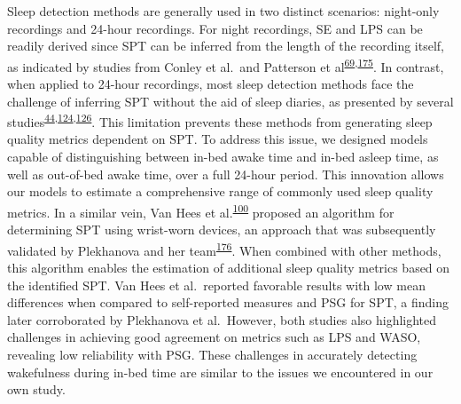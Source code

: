 \documentclass[
  10pt,
]{scrbook}
\begin{document}
Sleep detection methods are generally used in two distinct scenarios:
night-only recordings and 24-hour recordings. For night recordings, SE
and LPS can be readily derived since SPT can be inferred from the length
of the recording itself, as indicated by studies from Conley et al.~and
Patterson et
al\textsuperscript{\protect\hyperlink{ref-conley_agreement_2019}{69},\protect\hyperlink{ref-patterson_40_2023}{175}}.
In contrast, when applied to 24-hour recordings, most sleep detection
methods face the challenge of inferring SPT without the aid of sleep
diaries, as presented by several
studies\textsuperscript{\protect\hyperlink{ref-girschik_validation_2012}{44},\protect\hyperlink{ref-doherty_large_2017}{124},\protect\hyperlink{ref-anderson_assessment_2014}{126}}.
This limitation prevents these methods from generating sleep quality
metrics dependent on SPT. To address this issue, we designed models
capable of distinguishing between in-bed awake time and in-bed asleep
time, as well as out-of-bed awake time, over a full 24-hour period. This
innovation allows our models to estimate a comprehensive range of
commonly used sleep quality metrics. In a similar vein, Van Hees et
al.\textsuperscript{\protect\hyperlink{ref-van_hees_estimating_2018}{100}}
proposed an algorithm for determining SPT using wrist-worn devices, an
approach that was subsequently validated by Plekhanova and her
team\textsuperscript{\protect\hyperlink{ref-plekhanova_validation_2023}{176}}.
When combined with other methods, this algorithm enables the estimation
of additional sleep quality metrics based on the identified SPT. Van
Hees et al.~reported favorable results with low mean differences when
compared to self-reported measures and PSG for SPT, a finding later
corroborated by Plekhanova et al.~However, both studies also highlighted
challenges in achieving good agreement on metrics such as LPS and WASO,
revealing low reliability with PSG. These challenges in accurately
detecting wakefulness during in-bed time are similar to the issues we
encountered in our own study.
\end{document}
